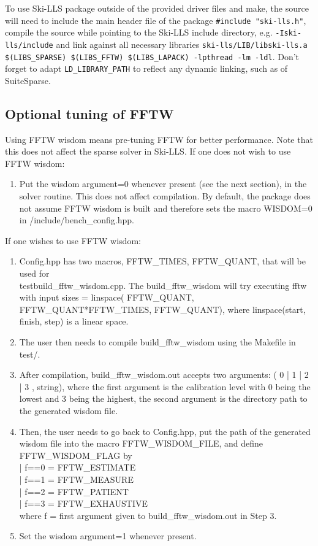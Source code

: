 \documentclass[english,11pt]{article}
\begin{document}
To use Ski-LLS package outside of the provided driver files and make, the source will need to include the main header file of the package {\tt \#include "ski-lls.h"}, compile the source while pointing to the Ski-LLS include directory, e.g. {\tt -Iski-lls/include} and link against all necessary libraries {\tt ski-lls/LIB/libski-lls.a \$(LIBS_SPARSE) \$(LIBS_FFTW) \$(LIBS_LAPACK) -lpthread -lm -ldl}. Don't forget to adapt {\tt LD_LIBRARY_PATH} to reflect any dynamic linking, such as of SuiteSparse.

\subsection{Optional tuning of FFTW}
Using FFTW wisdom means pre-tuning FFTW for better performance. Note that this does not affect the sparse solver in Ski-LLS.
If one does not wish to use FFTW wisdom:
		\begin{enumerate}
			\item Put the wisdom argument=0 whenever present (see the next section), in the solver routine. This does not affect compilation. By default, the package does not assume FFTW wisdom is built and therefore sets the macro WISDOM=0 in /include/bench_config.hpp.
		\end{enumerate}
If one wishes to use FFTW wisdom:
\begin{enumerate}
		\item Config.hpp has two macros, FFTW\_TIMES, FFTW\_QUANT, that will be used for \\ test\/build\_fftw\_wisdom.cpp. The build\_fftw\_wisdom will try executing fftw with input sizes = linspace( FFTW\_QUANT, FFTW\_QUANT*FFTW\_TIMES, FFTW\_QUANT), where linspace(start, finish, step) is a linear space.
	\item The user then needs to compile build_fftw_wisdom using the Makefile in test/. 
	\item After compilation, build_fftw_wisdom.out accepts two arguments: ( 0 | 1 | 2 | 3 , string), where the first argument is the calibration level with 0 being the lowest and 3 being the highest, the second argument is the directory path to the generated wisdom file. 
	\item Then, the user needs to go back to Config.hpp, put the path of the generated wisdom file into the macro FFTW_WISDOM_FILE, and define FFTW_WISDOM_FLAG by \\
	 | f==0	= FFTW_ESTIMATE \\
	 | f==1	= FFTW_MEASURE \\
	 | f==2	= FFTW_PATIENT \\
	 | f==3 	= FFTW_EXHAUSTIVE \\
		where f = first argument given to build_fftw_wisdom.out in Step 3. 
	
	\item Set the wisdom argument=1 whenever present.
	\end{enumerate}
\end{document}
